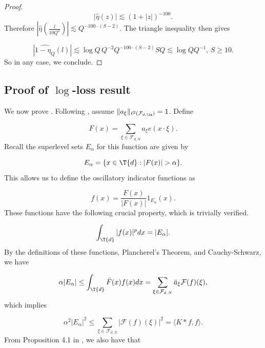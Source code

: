 \documentclass[11pt]{amsart}
\begin{document}
\begin{proof}
    \begin{equation*}
        |\hat{\eta}(z)|\lesssim (1+|z|)^{-100}.
    \end{equation*}
    Therefore $|\hat{\eta}(\frac{l}{10Q^2})|\lesssim Q^{-100\cdot(S-2)}$. The triangle inequality then gives

    \begin{equation*}
        |\widehat{1-\eta_Q}(l)| \lesssim \log Q\,Q^{-2}Q^{-100\cdot(S-2)} S Q\lesssim \log Q Q^{-1}, \, S\geq 10.
    \end{equation*}
    So in any case, we conclude.
\end{proof}

\subsection{Proof of $\log$-loss result}
We now prove . Following \cite{bourgainDemeterDiscreteRestrictImprovements2013}, assume $\|a_\xi\|_{\ell^2(\mathcal{F}_{d,\la})}=1$. Define

$$F(x) = \sum_{\xi\in \mathcal{F}_{d,N}}a_\xi e(x\cdot \xi).$$
Recall the superlevel sets $E_\alpha$ for this function are given by

$$E_\alpha = \{x\in\T{d}: |F(x)|>\alpha\}.$$
This allows us to define the oscillatory indicator functions as

\begin{equation*}
    f(x)=\frac{F(x)}{|F(x)|}1_{E_{\alpha}}(x).
\end{equation*}
These functions have the following crucial property, which is trivially verified.

\begin{equation*}
    \int_{\T{d}}|f(x)|^pdx = |E_\alpha|.
\end{equation*}
By the definitions of these functions, Plancherel's Theorem, and Cauchy-Schwarz, we have

\begin{equation*}
    \alpha |E_\alpha|\leq \int_{\T{d}}\bar{F}(x)f(x)dx = \sum_{\xi\in \mathcal{F}_{d,N}}\bar{a}_\xi \mathcal{F}(f)(\xi),
\end{equation*}
which implies

\begin{equation*}
        \alpha^2 |E_\alpha|^2\leq \sum_{\xi\in \mathcal{F}_{d,N}}|\mathcal{F}(f)(\xi)|^2 = \langle K*f,f \rangle.
\end{equation*}
From Proposition 4.1 in \cite{bourgainDemeterDiscreteRestrictImprovements2013}, we also have that
\end{document}
